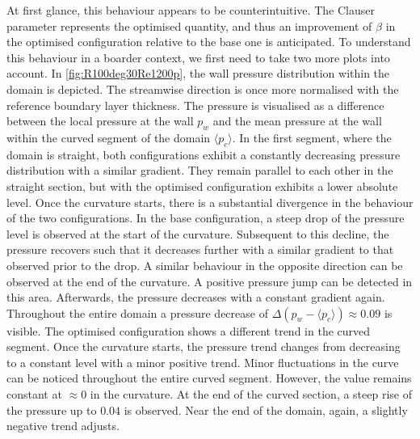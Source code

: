 At first glance, this behaviour appears to be counterintuitive. The Clauser parameter represents the optimised quantity, and thus an improvement of $\beta$ in the optimised configuration relative to the base one is anticipated.
To understand this behaviour in a boarder context, we first need to take two more plots into account.
In \autoref{fig:R100deg30Re1200p}, the wall pressure distribution within the domain is depicted.
The streamwise direction is once more normalised with the reference boundary layer thickness. The pressure is visualised as a difference between the local pressure at the wall $p_w$ and the mean pressure at the wall within the curved segment of the domain $\langle p_c \rangle$.
In the first segment, where the domain is straight, both configurations exhibit a constantly decreasing pressure distribution with a similar gradient.
They remain parallel to each other in the straight section, but with the optimised configuration exhibits a lower absolute level.
Once the curvature starts, there is a substantial divergence in the behaviour of the two configurations.
In the base configuration, a steep drop of the pressure level is observed at the start of the curvature. 
Subsequent to this decline, the pressure recovers such that it decreases further with a similar gradient to that observed prior to the drop. 
A similar behaviour in the opposite direction can be observed at the end of the curvature.
A positive pressure jump can be detected in this area.
Afterwards, the pressure decreases with a constant gradient again.
Throughout the entire domain a pressure decrease of $\Delta(p_w-\langle p_c \rangle) \approx 0.09$ is visible.
The optimised configuration shows a different trend in the curved segment.
Once the curvature starts, the pressure trend changes from decreasing to a constant level with a minor positive trend.
Minor fluctuations in the curve can be noticed throughout the entire curved segment.
However, the value remains constant at $\approx 0$ in the curvature. 
At the end of the curved section, a steep rise of the pressure up to $0.04$ is observed.
Near the end of the domain, again, a slightly negative trend adjusts.



